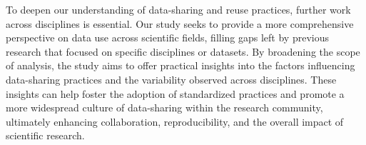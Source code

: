 To deepen our understanding of data-sharing and reuse practices, further work across disciplines is essential. Our study seeks to provide a more comprehensive perspective on data use across scientific fields, filling gaps left by previous research that focused on specific disciplines or datasets. By broadening the scope of analysis, the study aims to offer practical insights into the factors influencing data-sharing practices and the variability observed across disciplines. These insights can help foster the adoption of standardized practices and promote a more widespread culture of data-sharing within the research community, ultimately enhancing collaboration, reproducibility, and the overall impact of scientific research.